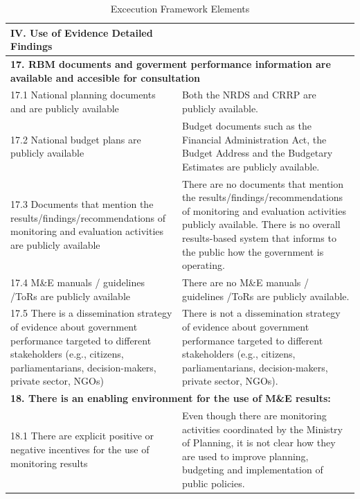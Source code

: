 \documentclass[
  10pt,
]{book}
\begin{document}
\begin{table}

\caption{\label{tab:unnamed-chunk-12}Excecution Framework Elements}
\centering
\begin{tabular}[t]{l|l}
\hline
IV. Use of Evidence Detailed Findings &  \\
\hline
\multicolumn{2}{l}{\textbf{17. RBM documents and goverment performance information are available and accesible for consultation}}\\
\hline
\hspace{1em}17.1 National planning documents and are publicly available & Both the NRDS and CRRP are publicly available.\\
\hline
\hspace{1em}17.2 National budget plans are publicly available & Budget documents such as the Financial Administration Act, the Budget Address and the Budgetary Estimates are publicly available.\\
\hline
\hspace{1em}17.3 Documents that mention the results/findings/recommendations of monitoring and evaluation activities are publicly available & There are no documents that mention the results/findings/recommendations of monitoring and evaluation activities publicly available. There is no overall results-based system that informs to the public how the government is operating.\\
\hline
\hspace{1em}17.4 M\&E manuals / guidelines /ToRs are publicly available & There are no M\&E manuals / guidelines /ToRs are publicly available.\\
\hline
\hspace{1em}17.5 There is a dissemination strategy of evidence about government performance targeted to different stakeholders (e.g., citizens, parliamentarians, decision-makers, private sector, NGOs) & There is not a dissemination strategy of evidence about government performance targeted to different stakeholders (e.g., citizens, parliamentarians, decision-makers, private sector, NGOs).\\
\hline
\multicolumn{2}{l}{\textbf{18. There is an enabling environment for the use of M\&E results:}}\\
\hline
\hspace{1em}18.1 There are explicit positive or negative incentives for the use of monitoring results & Even though there are monitoring activities coordinated by the Ministry of Planning, it is not clear how they are used to improve planning, budgeting and implementation of public policies.\\

\end{tabular}
\end{table}
\end{document}
